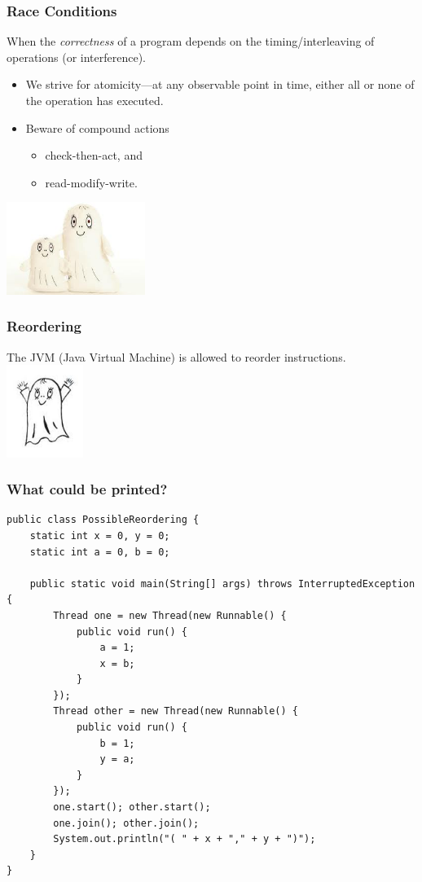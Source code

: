 \documentclass[notheorems]{beamer}%
\theoremstyle{definition}
\begin{document}
\begin{frame}
  \frametitle{Race Conditions}
  When the \emph{correctness} of a program depends on the timing/interleaving
  of operations (or interference).

  \begin{itemize}
  \item We strive for \alert{atomicity}---at any observable point in time,
    either all or none of the operation has executed.
  \item Beware of \alert{compound actions}
    \begin{itemize}
      \item check-then-act, and
      \item read-modify-write.
    \end{itemize}
  \end{itemize}
  \hfill\includegraphics[height=3cm]{spok2.jpg}
\end{frame}

\begin{frame}
  \frametitle{Reordering}
  The JVM (Java Virtual Machine) is allowed to \alert{reorder} instructions.
  \includegraphics[height=3cm]{spok.jpg}
\end{frame}

\begin{frame}[fragile]
  \frametitle{What could be printed?}
\tiny
\begin{verbatim}
public class PossibleReordering {
    static int x = 0, y = 0;
    static int a = 0, b = 0;

    public static void main(String[] args) throws InterruptedException {
        Thread one = new Thread(new Runnable() {
            public void run() {
                a = 1;
                x = b;
            }
        });
        Thread other = new Thread(new Runnable() {
            public void run() {
                b = 1;
                y = a;
            }
        });
        one.start(); other.start();
        one.join(); other.join();
        System.out.println("( " + x + "," + y + ")");
    }
}
\end{verbatim}
\normalsize
\end{frame}
\end{document}
